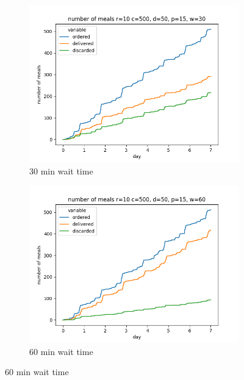 \begin{center}

    \begin{figure}
        \centering
        \begin{subfigure}[m]{0.30\textwidth}
            \centering
            \includegraphics[width=\textwidth]{sections/run4/week_nd_1_food_ordering_distribution_500_10_50_30}
            \caption{30 min wait time}
        \end{subfigure}
        \hfill
        \begin{subfigure}[m]{0.30\textwidth}
            \centering
            \includegraphics[width=\textwidth]{sections/run4/week_nd_2_food_ordering_distribution_500_10_50_60}
            \caption{60 min wait time}

\end{subfigure}
\end{figure}
\end{center}
